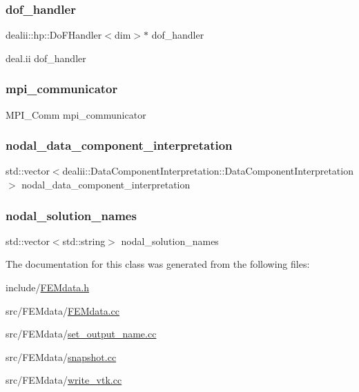 \subsubsection{\texorpdfstring{dof\_handler}{dof\_handler}}
{\footnotesize\ttfamily dealii\+::hp\+::\+Do\+F\+Handler$<$dim$>$$\ast$ dof\+\_\+handler}

deal.\+ii dof\+\_\+handler \mbox{\label{class_f_e_mdata_a03728ed636ca889ae407c84d181bc611}} 
\subsubsection{\texorpdfstring{mpi\_communicator}{mpi\_communicator}}
{\footnotesize\ttfamily M\+P\+I\+\_\+\+Comm mpi\+\_\+communicator}

\mbox{\label{class_f_e_mdata_a42965751ff10a28b5add7c0bfa265cee}} 
\subsubsection{\texorpdfstring{nodal\_data\_component\_interpretation}{nodal\_data\_component\_interpretation}}
{\footnotesize\ttfamily std\+::vector$<$dealii\+::\+Data\+Component\+Interpretation\+::\+Data\+Component\+Interpretation$>$ nodal\+\_\+data\+\_\+component\+\_\+interpretation}

\mbox{\label{class_f_e_mdata_a7b00177ad21830fe46a5bf4b1b4a3ea5}} 
\subsubsection{\texorpdfstring{nodal\_solution\_names}{nodal\_solution\_names}}
{\footnotesize\ttfamily std\+::vector$<$std\+::string$>$ nodal\+\_\+solution\+\_\+names}



The documentation for this class was generated from the following files\+:\begin{DoxyCompactItemize}
\item 
include/\mbox{\hyperlink{_f_e_mdata_8h}{F\+E\+Mdata.\+h}}\item 
src/\+F\+E\+Mdata/\mbox{\hyperlink{_f_e_mdata_8cc}{F\+E\+Mdata.\+cc}}\item 
src/\+F\+E\+Mdata/\mbox{\hyperlink{set__output__name_8cc}{set\+\_\+output\+\_\+name.\+cc}}\item 
src/\+F\+E\+Mdata/\mbox{\hyperlink{snapshot_8cc}{snapshot.\+cc}}\item 
src/\+F\+E\+Mdata/\mbox{\hyperlink{write__vtk_8cc}{write\+\_\+vtk.\+cc}}\end{DoxyCompactItemize}
